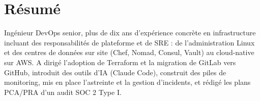 
\section{Résumé}
\vspace{0.5em}
{\small
\hspace{0.7em}\begin{minipage}[t]{\dimexpr\linewidth - 1.4em\relax}
Ingénieur DevOps senior, plus de dix ans d'expérience concrète en infrastructure incluant des responsabilités de plateforme et de SRE : de l'administration Linux et des centres de données sur site (Chef, Nomad, Consul, Vault) au cloud-native sur AWS. A dirigé l'adoption de Terraform et la migration de GitLab vers GitHub, introduit des outils d'IA (Claude Code), construit des piles de monitoring, mis en place l'astreinte et la gestion d'incidents, et rédigé les plans PCA/PRA d'un audit SOC 2 Type I.
\vspace{0.5em}
\end{minipage}
}
